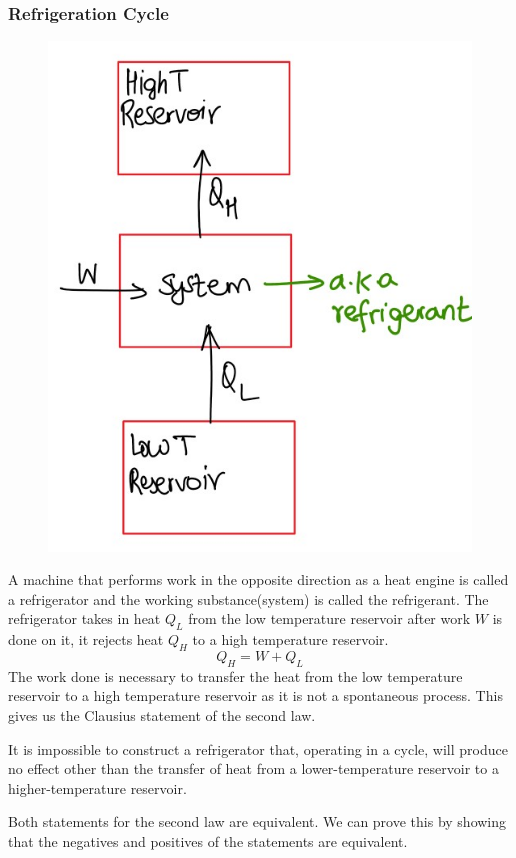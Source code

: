 \documentclass[12pt]{article}
\begin{document}
\subsubsection{Refrigeration Cycle}
\begin{figure}[h]
	\includegraphics[scale=0.8]{refrigeration.jpg}
	\centering
\end{figure}
A machine that performs work in the opposite direction as a heat engine is called a refrigerator and the working substance(system) is called the refrigerant. The refrigerator takes in heat $Q_L$ from the low temperature reservoir after work $W$ is done on it, it rejects heat $Q_H$ to a high temperature reservoir. 
$$Q_H=W+Q_L$$
The work done is necessary to transfer the heat from the low temperature reservoir to a high temperature reservoir as it is not a spontaneous process. This gives us the Clausius statement of the second law.
\begin{tcolorbox}[title=Clausius Statement of the Second Law]
	It is impossible to construct a refrigerator that, operating in a cycle, will produce no effect other than the transfer of heat from a lower-temperature reservoir to a higher-temperature reservoir.
\end{tcolorbox}
Both statements for the second law are equivalent. We can prove this by showing that the negatives and positives of the statements are equivalent. 
\end{document}
